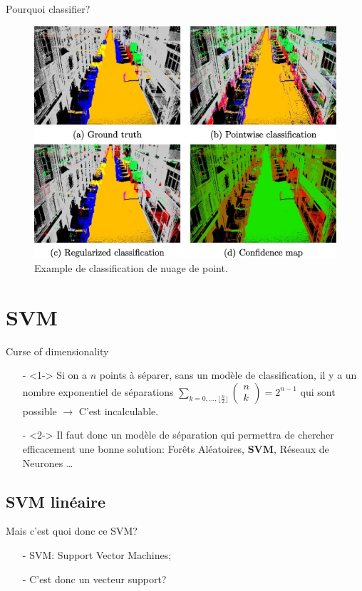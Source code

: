 \documentclass[9pt]{beamer}
\begin{document}
	\begin{frame}{Pourquoi classifier?}
		\begin{figure}[H]
			\includegraphics[width=.7\textwidth]{pc_classification}
			\caption{\label{fig::pc_classif}Example de classification de nuage de point\cite{LANDRIEU2017102}.}
		\end{figure}
	\end{frame}

	\section[SVM]{SVM}
	\begin{frame}{Curse of dimensionality}
		\begin{itemize}
			\item[-]<1-> Si on a $n$ points à séparer, sans un modèle de classification, il y a un nombre exponentiel de séparations $\sum_{k=0,\dots,\lfloor \frac{n}{2} \rfloor} \begin{pmatrix}
			n\\
			k
			\end{pmatrix} = 2^{n-1}$ qui sont possible $\longrightarrow$ C'est incalculable.
			\item[-]<2-> Il faut donc un modèle de séparation qui permettra de chercher efficacement une bonne solution: Forêts Aléatoires, \textbf{SVM}, Réseaux de Neurones \dots
		\end{itemize}
	\end{frame}
	\subsection[linear]{SVM linéaire}
	\begin{frame}{Mais c'est quoi donc ce SVM?}
		\begin{itemize}
			\item[-] SVM: Support Vector Machines;
			\item[-] C'est donc un vecteur support?
		\end{itemize}
	\end{frame}
\end{document}
